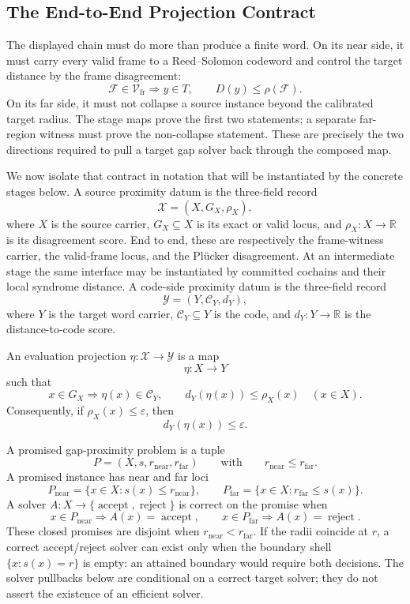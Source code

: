 \subsection{The End-to-End Projection Contract}

The displayed chain must do more than produce a finite word.  On its near
side, it must carry every valid frame to a Reed--Solomon codeword and control
the target distance by the frame disagreement:
\[
  \mathcal F\in\mathcal V_{\mathrm{fr}}
  \Longrightarrow y\in T,
  \qquad
  D(y)\le \rho(\mathcal F).
\]
On its far side, it must not collapse a source instance beyond the calibrated
target radius.  The stage maps prove the first two statements; a separate
far-region witness must prove the non-collapse statement.  These are precisely
the two directions required to pull a target gap solver back through the
composed map.

We now isolate that contract in notation that will be instantiated by the
concrete stages below.  A source proximity datum is the three-field record
\[
  \mathcal X=(X,G_X,\rho_X),
\]
where \(X\) is the source carrier, \(G_X\subseteq X\) is its exact or valid
locus, and \(\rho_X:X\to\mathbb R\) is its disagreement score.  End to end,
these are respectively the frame-witness carrier, the valid-frame locus, and
the Pl\"ucker disagreement.  At an intermediate stage the same interface may be
instantiated by committed cochains and their local syndrome distance.  A
code-side proximity datum is the three-field record
\[
  \mathcal Y=(Y,\mathcal C_Y,d_Y),
\]
where \(Y\) is the target word carrier, \(\mathcal C_Y\subseteq Y\) is
the code, and \(d_Y:Y\to\mathbb R\) is the distance-to-code score.

\begin{definition}\label{def:evaluation-projection}
An evaluation projection \(\eta:\mathcal X\to\mathcal Y\) is a map
\[
  \eta:X\longrightarrow Y
\]
such that
\[
  x\in G_X\Longrightarrow \eta(x)\in\mathcal C_Y,
  \qquad
  d_Y(\eta(x))\le \rho_X(x)
  \quad(x\in X).
\]
Consequently, if \(\rho_X(x)\le \varepsilon\), then
\[
  d_Y(\eta(x))\le \varepsilon.
\]
\end{definition}

A promised gap-proximity problem is a tuple
\[
  P=(X,s,r_{\mathrm{near}},r_{\mathrm{far}})
  \qquad
  \text{with}\qquad r_{\mathrm{near}}\le r_{\mathrm{far}}.
\]
A promised instance has near and far loci
\[
  P_{\mathrm{near}}=\{x\in X:s(x)\le r_{\mathrm{near}}\},
  \qquad
  P_{\mathrm{far}}=\{x\in X:r_{\mathrm{far}}\le s(x)\}.
\]
A solver \(A:X\to\{\operatorname{accept},\operatorname{reject}\}\) is correct
on the promise when
\[
  x\in P_{\mathrm{near}}\Rightarrow A(x)=\operatorname{accept},
  \qquad
  x\in P_{\mathrm{far}}\Rightarrow A(x)=\operatorname{reject}.
\]
These closed promises are disjoint when
\(r_{\mathrm{near}}<r_{\mathrm{far}}\). If the radii coincide at \(r\), a
correct accept/reject solver can exist only when the boundary shell
\(\{x:s(x)=r\}\) is empty: an attained boundary would require both decisions.
The solver pullbacks below are conditional on a correct target solver; they
do not assert the existence of an efficient solver.


